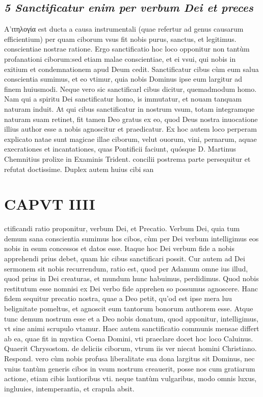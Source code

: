 \documentclass{article}
\begin{document}
\begin{pages}
\subsection*{\textit{5 Sanctificatur enim per verbum Dei et preces }}\pstart Α’ιτηλογία est ducta a causa instrumentali (quae refertur ad genus causarum efficientium) per quam ciborum vsus fit nobis purus, sanctus, et legitimus. conscientiae nostrae ratione. Ergo sanctificatio hoc loco opponitur non tantùm profanationi ciborum:sed etiam malae conscientiae, et ei vsui, qui nobis in exitium et condemnationem apud Deum cedit. Sanctificatur cibus cùm eum salua conscientia sumimus, et eo vtimur, quia nobis Dominus ipse eum largitur ad finem huiusmodi. Neque vero sic sanctificarl cibus dicitur, quemadmodum homo. Nam qui a spiritu Dei sanctificatur homo, is immutatur, et nouam tanquam naturam induit. At qui cibus sanctificatur in nostrum vsum, totam integramque naturam suam retinet, fit tamen Deo gratus ex eo, quod Deus nostra inuocatione illius author esse a nobis agnoscitur et praedicatur. Ex hoc autem loco perperam explicato natae sunt magicae illae ciborum, velut ouorum, vini, pernarum, aquae execrationes et incantationes, quas Pontificii faciunt, quósque D. Martinus Chemnitius prolixe in Examinis Trident. concilii postrema parte persequitur et refutat doctissime. Duplex autem huius cibi san\pend
\section*{CAPVT  IIII }
\marginpar{[ p.19 ]}\pstart ctificandi ratio proponitur, verbum Dei, et Precatio. Verbum Dei, quia tum demum sana conscientia sumimus hos cibos, cùm per Dei verbum intelligimus eos nobis in esum concessos et datos esse. Itaque hoc Dei verbum fide a nobis apprehendi prius debet, quam hic cibus sanctificari possit. Cur autem ad Dei sermonem sit nobis recurrendum, ratio est, quod per Adamum omne ius illud, quod prius in Dei creaturas, et mundum hunc habuimus, perdidimus. Quod nobis restitutum esse nomnisi ex Dei verbo fide apprehen so possumus agnoscere. Hanc fidem sequitur precatio nostra, quae a Deo petit, qu'od est ipse mera luu belignitate pomeltus, et agnoscit eum tantorum bonorum authorem esse. Atque tunc demum nostrum esse et a Deo nobis donatum, quod apponitur, intelligimus, vt sine animi scrupulo vtamur.  \pend\pstart Haec autem sanctificatio communis mensae differt ab ea, quae fit in mystica Coena Domini, vti praeclare docet hoc loco Caluinus.  \pend\pstart Quaerit Chrysostom. de deliciis ciborum, vtrum iis ver niecat homini Christiano. Respond. vero cùm nobis profusa liberalitate sua dona largitus sit Dominus, nec vnius tantùm generis cibos in vsum nostrum creauerit, posse nos cum gratiarum actione, etiam cibis lautioribus vti. neque tantùm vulgaribus, modo omnis luxus, ingluuies, intemperantia, et crapula absit.  \pend
{}
{}

\end{pages}
\end{document}
